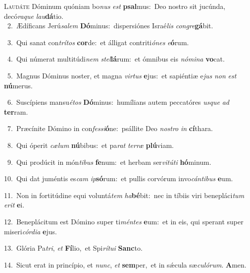 \lettrine{\initial\textcolor{\initialcolor}{L}}{audáte} Dóminum quóniam bo\textit{nus} \textit{est} \textbf{psal}\-mus:~\star Deo nostro sit jucúnda, decó\-\textit{ra}\-\textit{que} \textit{lau}\-\textbf{dá}tio.\\
{\numbfont\textcolor{\numbcolor}{~2.}}~Ædíficans Jerú\-\textit{sa}\-\textit{lem} \textbf{Dó}\-minus:~\star dispersiónes Israé\textit{lis} \textit{con}\-\textit{gre}\textbf{gá}bit.\par
{\numbfont\textcolor{\numbcolor}{~3.}}~Qui sanat con\-\textit{trí}\-\textit{tos} \textbf{cor}\-de:~\star et álligat contriti\-\textit{ó}\-\textit{nes} \textit{e}\-\textbf{ó}rum.\par
{\numbfont\textcolor{\numbcolor}{~4.}}~Qui númerat multitúdi\textit{nem} \textit{stel}\-\textbf{lá}rum:~\star et ómnibus eis \textit{nó}\-\textit{mi}\textit{na} \textbf{vo}\-cat.\par
{\numbfont\textcolor{\numbcolor}{~5.}}~Magnus Dóminus noster, et magna \textit{vir}\-\textit{tus} \textbf{e}\-jus:~\star et sapiéntiæ e\textit{jus} \textit{non} \textit{est} \textbf{nú}\-merus.\par
{\numbfont\textcolor{\numbcolor}{~6.}}~Suscípiens mansu\-\textit{é}\-\textit{tos} \textbf{Dó}\-minus:~\star humílians autem peccatóres \textit{us}\-\textit{que} \textit{ad} \textbf{ter}\-ram.\par
{\numbfont\textcolor{\numbcolor}{~7.}}~Præcínite Dómino in con\-\textit{fes}\-\textit{si}\textbf{ó}ne:~\star psállite Deo \textit{nos}\-\textit{tro} \textit{in} \textbf{cí}\-thara.\par
{\numbfont\textcolor{\numbcolor}{~8.}}~Qui óperit \textit{cæ}\-\textit{lum} \textbf{nú}\-bibus:~\star et pa\textit{rat} \textit{ter}\-\textit{ræ} \textbf{plú}\-viam.\par
{\numbfont\textcolor{\numbcolor}{~9.}}~Qui prodúcit in món\-\textit{ti}\-\textit{bus} \textbf{fe}\-num:~\star et herbam ser\-\textit{vi}\-\textit{tú}\textit{ti} \textbf{hó}\-minum.\par
{\numbfont\textcolor{\numbcolor}{10.}}~Qui dat juméntis es\textit{cam} \textit{ip}\-\textbf{só}rum:~\star et pullis corvórum invo\-\textit{cán}\-\textit{ti}\textit{bus} \textbf{e}\-um.\par
{\numbfont\textcolor{\numbcolor}{11.}}~Non in fortitúdine equi voluntá\textit{tem} \textit{ha}\-\textbf{bé}bit:~\star nec in tíbiis viri benepláci\textit{tum} \textit{e}\-\textit{rit} \textbf{e}\-i.\par
{\numbfont\textcolor{\numbcolor}{12.}}~Beneplácitum est Dómino super ti\-\textit{mén}\-\textit{tes} \textbf{e}\-um:~\star et in eis, qui sperant super miseri\-\textit{cór}\-\textit{di}\textit{a} \textbf{e}\-jus.\par
{\numbfont\textcolor{\numbcolor}{13.}}~Glória Pa\-\textit{tri}\-, \textit{et} \textbf{Fí}\-lio,~\star et Spi\-\textit{rí}\-\textit{tu}\textit{i} \textbf{Sanc}\-to.\par
{\numbfont\textcolor{\numbcolor}{14.}}~Sicut erat in princípio, et \textit{nunc}\-, \textit{et} \textbf{sem}\-per,~\star et in sǽcula sæ\-\textit{cu}\-\textit{ló}\textit{rum}. \textbf{A}\-men.\par
